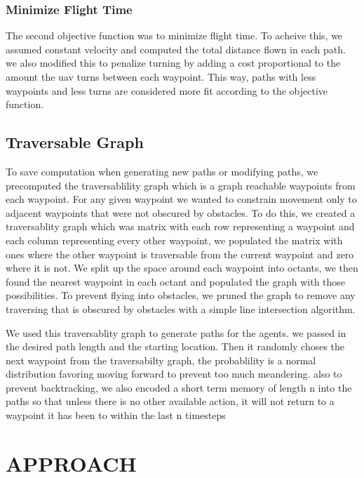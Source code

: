 \documentclass[letterpaper, 10 pt, conference]{ieeeconf}  %
\begin{document}
\subsubsection{Minimize Flight Time}

The second objective function was to minimize flight time. To acheive this, we assumed constant velocity and computed the total distance flown in each path. we also modified this to penalize turning by adding a cost proportional to the amount the uav turns between each waypoint. This way, paths with less waypoints and less turns are considered more fit according to the objective function.

\subsection{Traversable Graph}

To save computation when generating new paths or modifying paths, we precomputed the traversablility graph which is a graph reachable waypoints from each waypoint. For any given waypoint we wanted to constrain movement only to adjacent waypoints that were not obscured by obstacles. To do this, we created a traversablity graph which was matrix with each row representing a waypoint and each column representing every other waypoint, we populated the matrix with ones where the other waypoint is traversable from the current waypoint and zero where it is not. We split up the space around each waypoint into octants, we then found the nearest waypoint in each octant and populated the graph with those possibilities. To prevent flying into obstacles, we pruned the graph to remove any traversing that is obscured by obstacles with a simple line intersection algorithm.

We used this traversablity graph to generate paths for the agents. we passed in the desired path length and the starting location. Then it randomly choses the next waypoint from the traversabilty graph, the probablility is a normal distribution favoring moving forward to prevent too much meandering. also to prevent backtracking, we also encoded a short term memory of length n into the paths so that unless there is no other available action, it will not return to a waypoint it has been to within the last n timesteps

\section{APPROACH}\label{approach}
\end{document}
